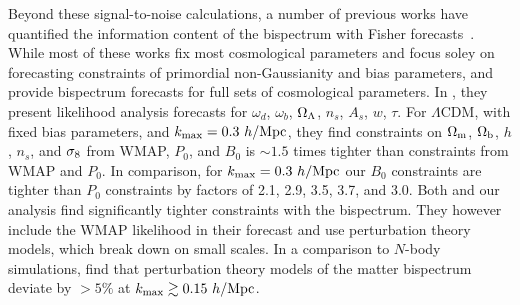 Beyond these signal-to-noise calculations, a number of previous works 
have quantified the information content of the bispectrum with Fisher 
forecasts~\citep{scoccimarro2004, sefusatti2006, sefusatti2007, song2015, tellarini2016, yamauchi2017a, karagiannis2018, yankelevich2019}. 
While most of these works fix most cosmological parameters and focus soley 
on forecasting constraints of primordial non-Gaussianity and bias parameters, 
\cite{sefusatti2006} and \cite{yankelevich2019} provide 
bispectrum forecasts for full sets of cosmological parameters. In \cite{sefusatti2006}, 
they present likelihood analysis forecasts for $\omega_d$, $\omega_b$, $\Omega_\Lambda$, 
$n_s$, $A_s$, $w$, $\tau$. %
For $\Lambda$CDM, with fixed bias parameters, and $k_{\rm max} = 0.3~h/{\rm Mpc}$, 
they find constraints on $\Omega_{\rm m}$, $\Omega_{\rm b}$, $h$, $n_s$, and $\sigma_8$ from WMAP, 
$P_0$, and $B_0$ is $\sim 1.5$ times tighter than constraints from WMAP 
and $P_0$. In comparison, for 
$k_{\rm max} = 0.3~h/{\rm Mpc}$ our $B_0$ constraints are tighter than $P_0$ constraints 
by factors of 2.1, 2.9, 3.5, 3.7, and 3.0. Both \cite{sefusatti2006} and our 
analysis find significantly tighter constraints with the bispectrum. They 
however include the WMAP likelihood in their forecast and use perturbation 
theory models, which break down on small scales. In a comparison to $N$-body 
simulations, \cite{lazanu2016} find that 
perturbation theory models of the matter bispectrum deviate by $>5\%$ 
at $k_{\rm max} \gtrsim 0.15~h/{\rm Mpc}$. 

